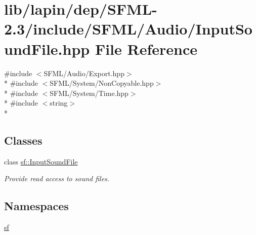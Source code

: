 \hypertarget{lapin_2dep_2_s_f_m_l-2_83_2include_2_s_f_m_l_2_audio_2_input_sound_file_8hpp}{\section{lib/lapin/dep/\-S\-F\-M\-L-\/2.3/include/\-S\-F\-M\-L/\-Audio/\-Input\-Sound\-File.hpp File Reference}
\label{lapin_2dep_2_s_f_m_l-2_83_2include_2_s_f_m_l_2_audio_2_input_sound_file_8hpp}
}
{\ttfamily \#include $<$S\-F\-M\-L/\-Audio/\-Export.\-hpp$>$}\\*
{\ttfamily \#include $<$S\-F\-M\-L/\-System/\-Non\-Copyable.\-hpp$>$}\\*
{\ttfamily \#include $<$S\-F\-M\-L/\-System/\-Time.\-hpp$>$}\\*
{\ttfamily \#include $<$string$>$}\\*
\subsection*{Classes}
\begin{DoxyCompactItemize}
\item 
class \hyperlink{classsf_1_1_input_sound_file}{sf\-::\-Input\-Sound\-File}
\begin{DoxyCompactList}\small\item\em Provide read access to sound files. \end{DoxyCompactList}\end{DoxyCompactItemize}
\subsection*{Namespaces}
\begin{DoxyCompactItemize}
\item 
\hyperlink{namespacesf}{sf}
\end{DoxyCompactItemize}
